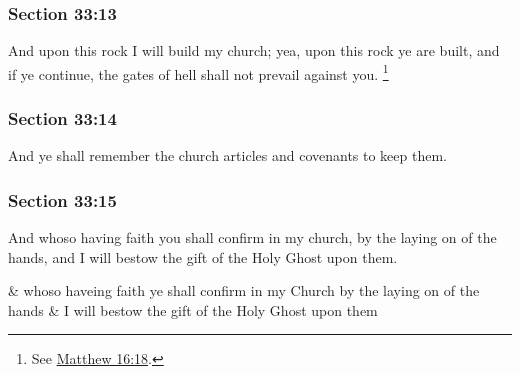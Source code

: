 	\subsubsection{Section 33:13} %
		\label{DC33-13}

		And upon this rock I will build my church; yea, upon this rock ye are built, and if ye continue, the gates of hell shall not prevail against you.%
			\footnote{%
				See \hyperref[MATTHEW-16-18]{Matthew 16:18}.
				}


	\subsubsection{Section 33:14} %
		\label{DC33-14}

		And ye shall remember the church articles and covenants to keep them.


	\subsubsection{Section 33:15} %
		\label{DC33-15}

		And whoso having faith you shall confirm in my church, by the laying on of the hands, and I will bestow the gift of the Holy Ghost upon them.

		\begin{framed}
		\scriptsize
			\begin{compactdesc}
				\item[JSP] \& whoso haveing faith ye shall confirm in my Church by the laying on of the hands \& I will bestow the gift of the Holy Ghost upon them
			\end{compactdesc}
		\end{framed}

